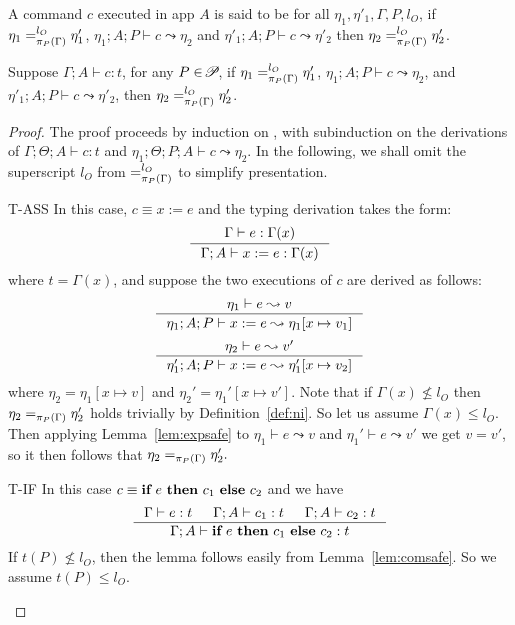 {{{%


\begin{definition}\label{def:ni}
A command $c$ executed in app $A$ is said to be {} 
for all $\eta_1, \eta'_1,\Gamma, P, l_{O}$,
if  $\eta_1 =_{\pi_{{P}}({\Gamma})}^{l_{O}} \eta'_1$, \; $\eta_1;A ; P\vdash c \leadsto \eta_2 $ and
 $\eta'_1; A; P\vdash c\leadsto \eta'_2  $
then $\eta_2 =_{\pi_{{P}}({\Gamma})}^{l_{O}} \eta'_2$.
\end{definition}


\begin{lemma}\label{lem:comni}
Suppose $\Gamma; A\vdash c : t$, for any $P\in\!\mathscr{P}\!$, if  $\eta_1 =_{\pi_{{P}}({\Gamma})}^{l_{O}} \eta'_1$, $\eta_1; A; P \vdash c \leadsto \eta_2$,
and  $\eta'_1; A; P \vdash c \leadsto \eta'_2$,
then  $\eta_2 =_{\pi_{{P}}({\Gamma})}^{l_{O}} \eta'_2$.
\end{lemma}
\begin{proof}
The proof proceeds by induction on , with subinduction
on the derivations of $\Gamma;\Theta;A \vdash c : t$ and $\eta_1;\Theta;P;A\vdash c \leadsto \eta_2$.
In the following, we shall omit the superscript $l_O$ from
$=^{l_O}_{\pi_{{P}}({\Gamma})}$ to simplify presentation.

\begin{ProofEnumDesc}
\item[T-ASS] In this case, $c \equiv x := e$ and the typing derivation takes the form:
$$
\inference
{\Gamma \vdash e : \Gamma(x)}
{\Gamma ; A \vdash \lcASS{x}{e} : \Gamma(x)}
$$
where $t = \Gamma(x)$, and suppose the two executions
of $c$ are derived as follows:
$$
\inference{\eta_1 \vdash e \leadsto v}
{\eta_1; A; P \vdash \lcASS{x}{e} \leadsto \eta_1 [ x \mapsto v_1 ]}
$$
$$
\inference{\eta_2 \vdash e \leadsto v'}
{\eta_1'; A; P \vdash \lcASS{x}{e} \leadsto \eta_1' [ x \mapsto v_2 ]}
$$
where $\eta_2 = \eta_1[x \mapsto v]$
and $\eta_2' = \eta_1'[x \mapsto v'].$
Note that if $\Gamma(x) \not \leq l_O$ then
$\eta_2 =_{\pi_{{P}}({\Gamma})} \eta_2'$ holds trivially
by Definition~\ref{def:ni}.
So let us assume $\Gamma(x) \leq l_O$. Then applying Lemma~\ref{lem:expsafe}
to
$\eta_1 \vdash e \leadsto v$
and $\eta_1' \vdash e \leadsto v'$
we get
$v = v'$, so it then follows that  $\eta_2 =_{\pi_{{P}}({\Gamma})} \eta_2'.$
\item[T-IF] In this case $c \equiv {\textbf{if}~{e}~\textbf{then}~{c_1}~\textbf{else}~{c_2}}$ and we have
$$
\inference
{\Gamma \vdash e : t & \Gamma ; A\vdash c_1 : t & \Gamma; A \vdash c_2 : t }
{\Gamma; A \vdash \lcIF{e}{c_1}{c_2} : t}
$$
If $t(P)\not\leq l_{O}$, then the lemma follows easily from
Lemma~\ref{lem:comsafe}. So we assume $t(P) \leq l_O.$


\end{ProofEnumDesc}
\end{proof}}}}
